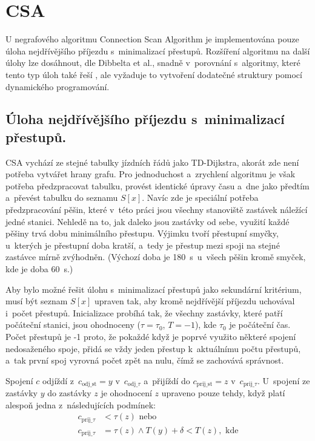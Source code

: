 \section{CSA}
\label{csaImplementace}
U negrafového algoritmu Connection Scan Algorithm je implementována pouze úloha nejdřívějšího příjezdu s~minimalizací přestupů. Rozšíření algoritmu na další úlohy lze dosáhnout, dle Dibbelta et al., snadně v~porovnání s~algoritmy, které tento typ úloh také řeší \cite{dibbelt2017CSA}, ale vyžaduje to vytvoření dodatečné struktury pomocí dynamického programování.

\subsection{Úloha nejdřívějšího příjezdu s~minimalizací přestupů.}
CSA vychází ze stejné tabulky jízdních řádů jako TD-Dijkstra, akorát zde není potřeba vytvářet hrany grafu. Pro jednoduchost a~zrychlení algoritmu je však potřeba předzpracovat tabulku, provést identické úpravy času a~dne jako předtím a~převést tabulku do seznamu \(S[x]\). Navíc zde je speciální potřeba předzpracování pěšin, které v~této práci jsou všechny stanoviště zastávek náležící jedné stanici. Nehledě na to, jak daleko jsou zastávky od sebe, využití každé pěšiny trvá dobu minimálního přestupu. Výjimku tvoří přestupní smyčky, u~kterých je přestupní doba kratší, a~tedy je přestup mezi spoji na stejné zastávce mírně zvýhodněn. (Výchozí doba je 180~s~u~všech pěšin kromě smyček, kde je doba 60~s.)

Aby bylo možné řešit úlohu s~minimalizací přestupů jako sekundární kritérium, musí být seznam $S[x]$ upraven tak, aby kromě nejdřívější příjezdu uchovával i~počet přestupů. Inicializace probíhá tak, že všechny zastávky, které patří počáteční stanici, jsou ohodnoceny ($\tau = \tau_0$, $T = -1$), kde \(\tau_0\) je počáteční čas. Počet přestupů je -1 proto, že pokaždé když je poprvé využito některé spojení nedosaženého spoje, přidá se vždy jeden přestup k~aktuálnímu počtu přestupů, a~tak první spoj vyrovná počet zpět na nulu, čímž se zachovává správnost.

Spojení \(c\) odjíždí z~\(c_{\text{odj\_st}} = y\) v~\(c_{\text{odj\_}\tau} \) a~přijíždí do \(c_{\text{prij\_st}} = z\) v~\(c_{\text{prij\_}\tau}\). U~spojení ze zastávky \(y\) do zastávky \(z\) je ohodnocení \(z\) upraveno pouze tehdy, když platí alespoň jedna z~následujících podmínek:
\begin{align*}
	c_{\text{prij\_}\tau} &< \tau(z)\text{ nebo}\\
	c_{\text{prij\_}\tau} &= \tau(z) \land T(y) + \delta < T(z), \text{ kde}
\end{align*}

